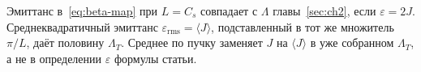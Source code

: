 Эмиттанс в~\eqref{eq:beta-map} при $L=C_s$ совпадает с $\Lambda$ главы~\ref{sec:ch2}, если $\varepsilon=2J$. Среднеквадратичный эмиттанс $\varepsilon_{\mathrm{rms}}=\langle J\rangle$, подставленный в тот же множитель $\pi/L$, даёт половину $\Lambda_T$. Среднее по пучку заменяет $J$ на $\langle J\rangle$ в уже собранном $\Lambda_T$, а не в определении $\varepsilon$ формулы статьи.
